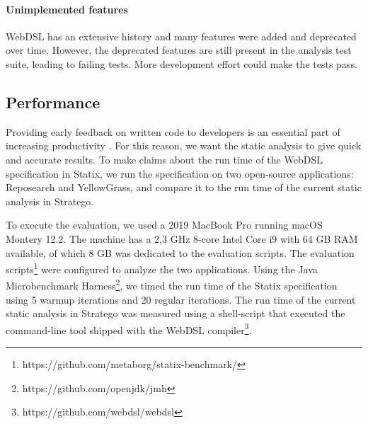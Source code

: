       \paragraph{Unimplemented features} WebDSL has an extensive history and many features were added and deprecated over time. However, the deprecated features are still present in the analysis test suite, leading to failing tests. More development effort could make the tests pass.

  \subsection{Performance}

    Providing early feedback on written code to developers is an essential part of increasing productivity \autocite{Becker2019}. For this reason, we want the static analysis to give quick and accurate results. To make claims about the run time of the WebDSL specification in Statix, we run the specification on two open-source applications: Reposearch and YellowGrass, and compare it to the run time of the current static analysis in Stratego.

    To execute the evaluation, we used a 2019 MacBook Pro running macOS Montery 12.2. The machine has a 2,3 GHz 8-core Intel Core i9 with 64 GB RAM available, of which 8 GB was dedicated to the evaluation scripts. The evaluation scripts\footnote{https://github.com/metaborg/statix-benchmark/} were configured to analyze the two applications. Using the Java Microbenchmark Harness\footnote{https://github.com/openjdk/jmh}, we timed the run time of the Statix specification using 5 warmup iterations and 20 regular iterations. The run time of the current static analysis in Stratego was measured using a shell-script that executed the command-line tool shipped with the WebDSL compiler\footnote{https://github.com/webdsl/webdsl}.

